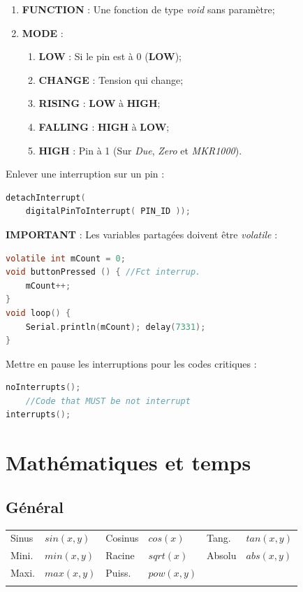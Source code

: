         \begin{enumerate}
            \item \textbf{FUNCTION} : Une fonction de type \textit{void} sans paramètre;
            \item \textbf{MODE} :
            \begin{enumerate}
                \item \textbf{LOW} : Si le pin est à 0 (\textbf{LOW});
                \item \textbf{CHANGE} : Tension qui change;
                \item \textbf{RISING} : \textbf{LOW} à \textbf{HIGH};
                \item \textbf{FALLING} : \textbf{HIGH} à \textbf{LOW};
                \item \textbf{HIGH} : Pin à 1 (Sur \textit{Due}, \textit{Zero} et \textit{MKR1000}).
            \end{enumerate}
        \end{enumerate}

        Enlever une interruption sur un pin :
        \begin{lstlisting}[language=C]
detachInterrupt(
    digitalPinToInterrupt( PIN_ID ));
        \end{lstlisting}

        \textbf{IMPORTANT} : Les variables partagées doivent être \textit{volatile} :

        \begin{lstlisting}[language=C]
volatile int mCount = 0;
void buttonPressed () { //Fct interrup.
    mCount++;
}
void loop() {
    Serial.println(mCount); delay(7331);
}
        \end{lstlisting}

        Mettre en pause les interruptions pour les codes critiques :
        \begin{lstlisting}[language=C]
noInterrupts();
    //Code that MUST be not interrupt
interrupts();
        \end{lstlisting}
    \section{Mathématiques et temps}
        \subsection{Général}
            \begin{center}
                \begin{tabular}{l l | l l | l l}
                    Sinus & $sin(x,y)$ & Cosinus & $cos(x) $ & Tang. & $tan(x,y)$\\
                    Mini. & $min(x,y)$ & Racine & $sqrt(x) $ & Absolu & $abs(x,y)$\\
                    Maxi. & $max(x,y)$ & Puiss. & $pow(x,y)$ & &\\ \\
                \end{tabular}
            \end{center}

